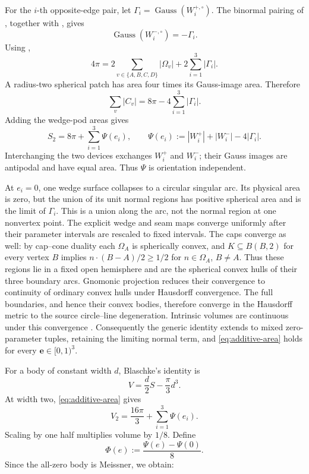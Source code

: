 \documentclass[11pt]{article}
\numberwithin{equation}{section}
\theoremstyle{remark}
\newcommand{\Gauss}{\operatorname{Gauss}}
\begin{document}
For the \(i\)-th opposite-edge pair, let \(\Gamma_i=\Gauss(W_i^{+,\circ})\).  The binormal pairing of \cite[Lemma~3.8]{ArelioMontejanoOliveros2023}, together with , gives
\[
  \Gauss(W_i^{-,\circ})=-\Gamma_i.
\]
Using ,
\begin{equation}
  4\pi
  =2\sum_{v\in\{A,B,C,D\}}|\Omega_v|
   +2\sum_{i=1}^3|\Gamma_i|.
  \label{eq:normal-partition}
\end{equation}
A radius-two spherical patch has area four times its Gauss-image area.  Therefore
\begin{equation}
  \sum_v|C_v|=8\pi-4\sum_{i=1}^3|\Gamma_i|.
  \label{eq:cap-elimination}
\end{equation}
Adding the wedge-pod areas gives
\begin{equation}
  S_2=8\pi+\sum_{i=1}^3\Psi(e_i),
  \qquad
  \Psi(e_i):=|W_i^+|+|W_i^-|-4|\Gamma_i|.
  \label{eq:additive-area}
\end{equation}
Interchanging the two devices exchanges \(W_i^+\) and \(W_i^-\); their Gauss images are antipodal and have equal area.  Thus \(\Psi\) is orientation independent.

At \(e_i=0\), one wedge surface collapses to a circular singular arc.
Its physical area is zero, but the union of its unit normal regions has
positive spherical area and is the limit of \(\Gamma_i\).  This is a union
along the arc, not the normal region at one nonvertex point.
The explicit wedge and seam maps converge uniformly after their parameter
intervals are rescaled to fixed intervals.  The caps converge as well:
by cap--cone duality each \(\Omega_A\) is spherically convex, and
\(K\subseteq B(B,2)\) for every vertex \(B\) implies
\(n\cdot(B-A)/2\ge1/2\) for \(n\in\Omega_A\), \(B\ne A\).
Thus these regions lie in a fixed open hemisphere and are the spherical
convex hulls of their three boundary arcs.  Gnomonic projection reduces
their convergence to continuity of ordinary convex hulls under Hausdorff
convergence.  The full boundaries, and hence their convex bodies, therefore
converge in the Hausdorff metric to the source circle--line degeneration.
Intrinsic volumes are continuous under this convergence \cite{Schneider2014}.
Consequently the generic identity extends to mixed zero-parameter tuples,
retaining the limiting normal term, and \eqref{eq:additive-area} holds for
every \(\mathbf e\in[0,1)^3\).

For a body of constant width \(d\), Blaschke's identity is
\begin{equation}
  V=\frac d2S-\frac\pi3d^3.
  \label{eq:blaschke}
\end{equation}
At width two, \eqref{eq:additive-area} gives
\[
  V_2=\frac{16\pi}{3}+\sum_{i=1}^3\Psi(e_i).
\]
Scaling by one half multiplies volume by \(1/8\).  Define
\begin{equation}
  \Phi(e):=\frac{\Psi(e)-\Psi(0)}8.
  \label{eq:phi-def}
\end{equation}
Since the all-zero body is Meissner, we obtain:
\end{document}
